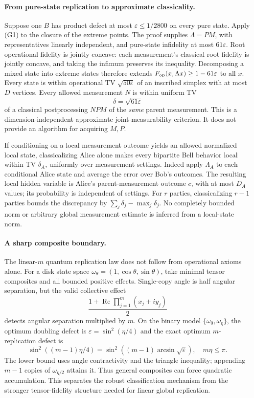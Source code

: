 \documentclass[11pt]{article}
\begin{document}
\paragraph{From pure-state replication to approximate classicality.}
Suppose one $B$ has product defect at most $\varepsilon\le1/2800$ on every pure state. Apply (G1) to the closure of the extreme points. The proof supplies $\Lambda=PM$, with representatives linearly independent, and pure-state infidelity at most $61\varepsilon$. Root operational fidelity is jointly concave: each measurement's classical root fidelity is jointly concave, and taking the infimum preserves its inequality. Decomposing a mixed state into extreme states therefore extends $F_{\rm op}(x,\Lambda x)\ge1-61\varepsilon$ to all $x$. Every state is within operational TV $\sqrt{50\varepsilon}$ of an inscribed simplex with at most $D$ vertices. Every allowed measurement $N$ is within uniform TV
\[
\delta=\sqrt{61\varepsilon}
\]
of a classical postprocessing $NPM$ of the \emph{same} parent measurement. This is a dimension-independent approximate joint-measurability criterion. It does not provide an algorithm for acquiring $M,P$.

If conditioning on a local measurement outcome yields an allowed normalized local state, classicalizing Alice alone makes every bipartite Bell behavior local within TV $\delta_A$, uniformly over measurement settings. Indeed apply $\Lambda_A$ to each conditional Alice state and average the error over Bob's outcomes. The resulting local hidden variable is Alice's parent-measurement outcome $c$, with at most $D_A$ values; its probability is independent of settings. For $r$ parties, classicalizing $r-1$ parties bounds the discrepancy by $\sum_j\delta_j-\max_j\delta_j$. No completely bounded norm or arbitrary global measurement estimate is inferred from a local-state norm.

\paragraph{A sharp composite boundary.}
The linear-$m$ quantum replication law does not follow from operational axioms alone. For a disk state space $\omega_\theta=(1,\cos\theta,\sin\theta)$, take minimal tensor composites and all bounded positive effects. Single-copy angle is half angular separation, but the valid collective effect
\[
\frac{1+\operatorname{Re}\prod_{j=1}^m(x_j+i y_j)}2
\]
detects angular separation multiplied by $m$. On the binary model $\{\omega_0,\omega_\eta\}$, the optimum doubling defect is $\varepsilon=\sin^2(\eta/4)$ and the exact optimum $m$-replication defect is
\[
\sin^2((m-1)\eta/4)
=\sin^2((m-1)\arcsin\sqrt\varepsilon),\quad m\eta\le\pi.
\]
The lower bound uses angle contractivity and the triangle inequality; appending $m-1$ copies of $\omega_{\eta/2}$ attains it. Thus general composites can force quadratic accumulation. This separates the robust classification mechanism from the stronger tensor-fidelity structure needed for linear global replication.
\end{document}
